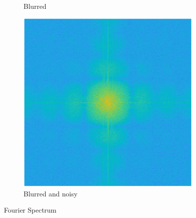 \begin{figure}[!ht]
\begin{subfigure}{0.32\textwidth}
        \caption{Blurred}
    \end{subfigure}
    \hfill
    \begin{subfigure}{0.32\textwidth}
        \centering
        \includegraphics[width=\textwidth]{Doc/Graphics/Part1/Q17_FT_Spectrum_Blurred and Noisy.png}
        \caption{Blurred and noisy}
    \end{subfigure}
    \caption{Fourier Spectrum}
    \label{fig:enter-label}
\end{figure}
\FloatBarrier









